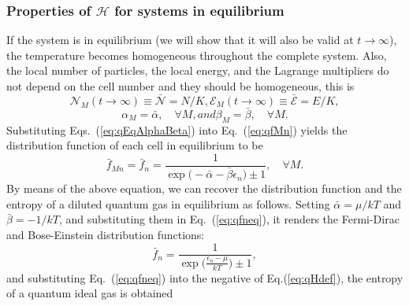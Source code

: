\subsubsection{Properties of $\mathcal{H}$ for systems in equilibrium}
If the system is in equilibrium (we will show that it will also be valid at $t\to\infty$), the temperature becomes homogeneous throughout
the complete system. Also, the local number of particles, the local
energy, and the Lagrange multipliers do not depend on the cell number and they should be homogeneous,
this is 
%
\begin{subequations}\label{eq:qEqRestrictions}
\begin{equation}
   {\mathcal{N}}_M(t\to\infty)\equiv \bar{\mathcal{N}}=N/K,
\end{equation}
%
%
\begin{equation}
	{\mathcal{E}}_M(t\to\infty)\equiv \bar{\mathcal{E}}=E/K,
\end{equation}
\end{subequations}
%
%
\begin{subequations}\label{eq:qEqAlphaBeta}
\begin{equation}
	\alpha_M=\bar\alpha,\quad\forall M,
\end{equation}
%
and
\begin{equation}
	\beta_M=\bar\beta, \quad\forall M.
\end{equation}
\end{subequations}
%
Substituting Eqs.~(\ref{eq:qEqAlphaBeta}) into Eq.~(\ref{eq:qfMn}) yields the distribution
function of each cell in equilibrium to be
%
\begin{equation}\label{eq:qfneq}
    \bar f_{Mn}=\bar f_n =\frac{1}{\exp\big(-\bar\alpha-\bar\beta \epsilon_n\big)\pm 1},\quad\forall M.
\end{equation}
%
By means of the above equation, we can recover the distribution function and the entropy of a diluted quantum gas in equilibrium as follows. Setting $\bar\alpha=\mu/kT$ and $\bar\beta=-1/kT$,
and substituting them in Eq.~(\ref{eq:qfneq}), it renders the Fermi-Dirac and Bose-Einstein
distribution functions:
%
\begin{equation}\label{eq:qfneqtwo}
    \bar{f}_{n}=\frac{1}{\exp\big(\frac{{\epsilon_n}-\mu}{kT}\big)\pm 1},
\end{equation}
%
and substituting Eq.~(\ref{eq:qfneq}) into the negative of Eq.(\ref{eq:qHdef}), 
the entropy of a quantum ideal gas is obtained
